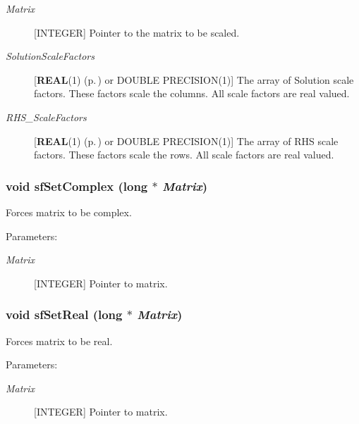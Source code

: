 \begin{Desc}
\begin{description}
\item[{\em 
Matrix}][INTEGER] Pointer to the matrix to be scaled. \item[{\em 
Solution\-Scale\-Factors}][{\bf REAL}(1) {\rm (p.\,\pageref{spConfig_8h_a0})} or DOUBLE PRECISION(1)] The array of Solution scale factors. These factors scale the columns. All scale factors are real valued. \item[{\em 
RHS\_\-Scale\-Factors}][{\bf REAL}(1) {\rm (p.\,\pageref{spConfig_8h_a0})} or DOUBLE PRECISION(1)] The array of RHS scale factors. These factors scale the rows. All scale factors are real valued. \end{description}
\end{Desc}
\subsubsection{\setlength{\rightskip}{0pt plus 5cm}void sf\-Set\-Complex (long $\ast$ {\em Matrix})}\label{spFortran_8c_a80}


Forces matrix to be complex.\begin{Desc}
\item[Parameters: ]\par
\begin{description}
\item[{\em 
Matrix}][INTEGER] Pointer to matrix. \end{description}
\end{Desc}
\subsubsection{\setlength{\rightskip}{0pt plus 5cm}void sf\-Set\-Real (long $\ast$ {\em Matrix})}\label{spFortran_8c_a79}


Forces matrix to be real.\begin{Desc}
\item[Parameters: ]\par
\begin{description}
\item[{\em 
Matrix}][INTEGER] Pointer to matrix. \end{description}
\end{Desc}
